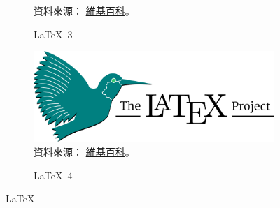 \documentclass[utf8,12pt]{article} %
\begin{document}
\begin{figure}[htbp]
\begin{subfigure}[b]{0.45\textwidth}
		\footnotesize{資料來源：
		\href{https://en.wikipedia.org/wiki/LaTeX}{維基百科}。}
		\caption{\LaTeX~3} 
		\label{LaTeX 3} %
	\end{subfigure}
	\hfill
	\begin{subfigure}[b]{0.45\textwidth}
		\centering
		\includegraphics[width=\textwidth]{Fig/LaTeX}
		\footnotesize{資料來源：
		\href{https://en.wikipedia.org/wiki/LaTeX}{維基百科}。}
		\caption{\LaTeX~4} 
		\label{LaTeX 4} %
	\end{subfigure}	
	\caption{\LaTeX} 
	\label{LaTeX} %
\end{figure}
%
%
\end{document}
